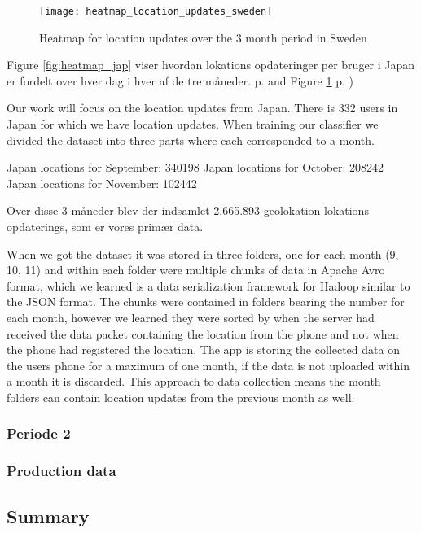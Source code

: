 \begin{figure}[H]
    \centering
    \texttt{[image: heatmap\_location\_updates\_sweden]}
    \caption{Heatmap for location updates over the 3 month period in Sweden}
    \label{fig:heatmap_swe}
\end{figure}


 Figure \ref{fig:heatmap_jap} viser hvordan lokations opdateringer per bruger i Japan er fordelt over hver dag i hver af de tre måneder. p.  \pageref{fig:heatmap_jap} and Figure \ref{fig:heatmap_swe} p. \pageref{fig:heatmap_swe})


Our work will focus on the location updates from Japan. There is 332 users in Japan for which we have location updates.
When training our classifier we divided the dataset into three parts where each corresponded to a month.

Japan locations for September: 340198
Japan locations for October: 208242
Japan locations for November: 102442



Over disse 3 måneder blev der indsamlet 2.665.893 geolokation lokations opdaterings, som er vores primær data. 

When we got the dataset it was stored in three folders, one for each month (9, 10, 11) and within each folder were multiple chunks of data in Apache Avro format\cite{apacheavro}, which we learned is a data serialization framework for Hadoop similar to the JSON format. The chunks were contained in folders bearing the number for each month, however we learned they were sorted by when the server had received the data packet containing the location from the phone and not when the phone had registered the location. The app is storing the collected data on the users phone for a maximum of one month, if the data is not uploaded within a month it is discarded. This approach to data collection means the month folders can contain location updates from the previous month as well.


\subsubsection{Periode 2}

\subsubsection{Production data}
\subsection{Summary}
